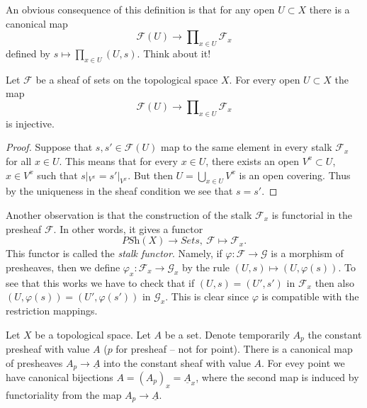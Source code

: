 \medskip\noindent
An obvious consequence of this definition is that
for any open $U \subset X$ there is a canonical map
$$
\mathcal{F}(U) 
\longrightarrow
\prod\nolimits_{x \in U} \mathcal{F}_x
$$
defined by $s \mapsto \prod_{x \in U} (U, s)$. Think about it!

\begin{lemma}
\label{lemma-sheaf-subset-stalks}
Let $\mathcal{F}$ be a sheaf of sets on the topological space $X$.
For every open $U \subset X$ the map
$$
\mathcal{F}(U) 
\longrightarrow
\prod\nolimits_{x \in U} \mathcal{F}_x
$$
is injective.
\end{lemma}

\begin{proof}
Suppose that $s, s' \in \mathcal{F}(U)$ map to the same element
in every stalk $\mathcal{F}_x$ for all $x \in U$. This means that
for every $x \in U$, there exists an open $V^x \subset U$,
$x \in V^x$ such that $s|_{V^x} = s'|_{V^x}$. But then
$U = \bigcup_{x \in U} V^x$ is an open covering. Thus by the
uniqueness in the sheaf condition we see that $s = s'$.
\end{proof}

\noindent
Another observation is that the construction of the stalk
$\mathcal{F}_x$ is functorial in the presheaf $\mathcal{F}$.
In other words, it gives a functor
$$
\textit{PSh}(X) \longrightarrow \textit{Sets},
\ \mathcal{F} \longmapsto \mathcal{F}_x.
$$
This functor is called the {\it stalk functor}.
Namely, if $\varphi : \mathcal{F} \to \mathcal{G}$ is 
a morphism of presheaves, then we define
$\varphi_x : \mathcal{F}_x \to \mathcal{G}_x$
by the rule $(U, s) \mapsto (U, \varphi(s))$.
To see that this works we have to check that
if $(U, s) = (U', s')$ in $\mathcal{F}_x$ then also
$(U, \varphi(s)) = (U', \varphi(s'))$ in $\mathcal{G}_x$.
This is clear since $\varphi$ is compatible with the
restriction mappings.

\begin{example}
\label{example-stalk-constant-presheaf}
Let $X$ be a topological space. Let $A$ be a set.
Denote temporarily $A_p$ the constant presheaf
with value $A$ ($p$ for presheaf -- not for point).
There is a canonical map of presheaves
$A_p \to \underline{A}$ into the constant sheaf with
value $A$. For evey point we have canonical
bijections $A = (A_p)_x = \underline{A}_x$, where
the second map is induced by functoriality from
the map $A_p \to \underline{A}$.
\end{example}



